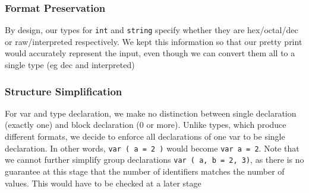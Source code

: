\documentclass[11pt]{article}
\begin{document}
\subsubsection{Format Preservation}
\label{sec:orgfeb50ec}
By design, our types for \texttt{int} and \texttt{string} specify whether they
are hex/octal/dec or raw/interpreted respectively. We kept this
information so that our pretty print would accurately represent
the input, even though we can convert them all to a single type
(eg dec and interpreted)
\subsubsection{Structure Simplification}
\label{sec:org55362e5}
For var and type declaration, we make no distinction between
single declaration (exactly one) and block declaration (0 or
more). Unlike types, which produce different formats, we decide to
enforce all declarations of one var to be single declaration. In
other words, \texttt{var ( a = 2 )} would become \texttt{var a = 2}. Note that
we cannot further simplify group declarations \texttt{var ( a, b = 2,
    3)}, as there is no guarantee at this stage that the number of
identifiers matches the number of values. This would have to be
checked at a later stage
\end{document}
